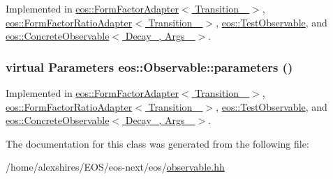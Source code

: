 Implemented in \hyperlink{classeos_1_1FormFactorAdapter_a758693e9a8fff947fe1500796f1bda4e}{eos::FormFactorAdapter$<$ Transition\_\- $>$}, \hyperlink{classeos_1_1FormFactorRatioAdapter_a4fe52226955dacc174be74224d8b627b}{eos::FormFactorRatioAdapter$<$ Transition\_\- $>$}, \hyperlink{structeos_1_1TestObservable_a6d762181ac0ce1d2d8ad9d377a3a565d}{eos::TestObservable}, and \hyperlink{classeos_1_1ConcreteObservable_ac8f34b0c5dc087982bf0d7b053cf07b5}{eos::ConcreteObservable$<$ Decay\_\-, Args\_\- $>$}.\hypertarget{classeos_1_1Observable_a233852d22f287944b8bbf4da803289b1}{
\subsubsection[{parameters}]{\setlength{\rightskip}{0pt plus 5cm}virtual {\bf Parameters} eos::Observable::parameters ()}}
\label{classeos_1_1Observable_a233852d22f287944b8bbf4da803289b1}


Implemented in \hyperlink{classeos_1_1FormFactorAdapter_aa1505da65e397bdda2e59ecfd49e375d}{eos::FormFactorAdapter$<$ Transition\_\- $>$}, \hyperlink{classeos_1_1FormFactorRatioAdapter_a7146382f5bfc1c2b59119e844a6201a6}{eos::FormFactorRatioAdapter$<$ Transition\_\- $>$}, \hyperlink{structeos_1_1TestObservable_ab6aef566fbe0f34117da1d484e20da40}{eos::TestObservable}, and \hyperlink{classeos_1_1ConcreteObservable_af5265ce9314987a7b7b01275b5410309}{eos::ConcreteObservable$<$ Decay\_\-, Args\_\- $>$}.

The documentation for this class was generated from the following file:\begin{DoxyCompactItemize}
\item 
/home/alexshires/EOS/eos-\/next/eos/\hyperlink{observable_8hh}{observable.hh}\end{DoxyCompactItemize}
